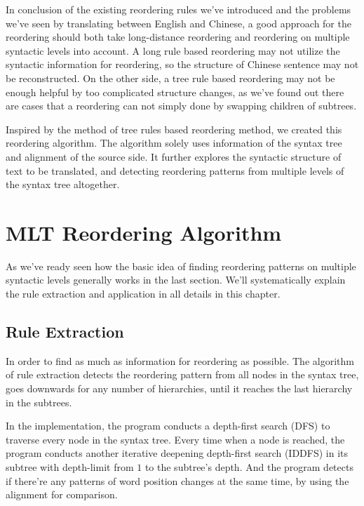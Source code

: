 In conclusion of the existing reordering rules we've introduced and the problems we've seen by translating between English and Chinese, a good approach for the reordering should both take long-distance reordering and reordering on multiple syntactic levels into account. A long rule based reordering may not utilize the syntactic information for reordering, so the structure of Chinese sentence may not be reconstructed. On the other side, a tree rule based reordering may not be enough helpful by too complicated structure changes, as we've found out there are cases that a reordering can not simply done by swapping children of subtrees. 

Inspired by the method of tree rules based reordering method, we created this reordering algorithm. The algorithm solely uses information of the syntax tree and alignment of the source side. It further explores the syntactic structure of text to be translated, and detecting reordering patterns from multiple levels of the syntax tree altogether.

\section{MLT Reordering Algorithm}
\label{ch:ReorderingApproach:sec:Algorithm}

As we've ready seen how the basic idea of finding reordering patterns on multiple syntactic levels generally works in the last section. We'll systematically explain the rule extraction and application in all details in this chapter.

\subsection{Rule Extraction}

In order to find as much as information for reordering as possible. The algorithm of rule extraction detects the reordering pattern from all nodes in the syntax tree, goes downwards for any number of hierarchies, until it reaches the last hierarchy in the subtrees.

In the implementation, the program conducts a depth-first search (DFS) to traverse every node in the syntax tree. Every time when a node is reached, the program conducts another iterative deepening depth-first search (IDDFS) in its subtree with depth-limit from $1$ to the subtree's depth. And the program detects if there're any patterns of word position changes at the same time, by using the alignment for comparison.

